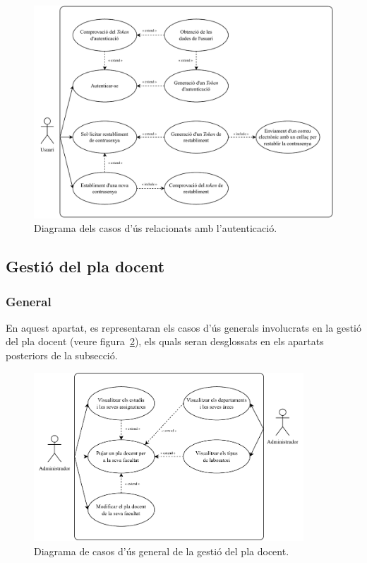 \documentclass[a4paper,12pt]{ThesisStyle}
\begin{document}
\begin{figure}[H]
  \centering
  \includegraphics[width=\textwidth]{assets/use_cases/auth.pdf}
  \caption{\label{img:casos_us_auth}Diagrama dels casos d'ús relacionats amb l'autenticació.}
\end{figure}

\subsection{Gestió del pla docent}
\label{subsec:casos_us_pla}

\subsubsection{General}

En aquest apartat, es representaran els casos d'ús generals involucrats en la gestió del pla docent (veure figura~\ref{img:casos_us_pla_general}), els quals seran desglossats en els apartats posteriors de la subsecció.

\begin{figure}[H]
  \centering
  \includegraphics[width=0.9\textwidth]{assets/use_cases/pla_docent/general.pdf}
  \caption{\label{img:casos_us_pla_general}Diagrama de casos d'ús general de la gestió del pla docent.}
\end{figure}
\end{document}

